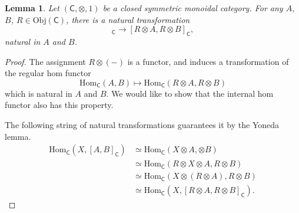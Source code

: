 \documentclass[a4paper,10pt]{scrreprt}
\newcommand{\Obj}{\mathrm{Obj}}
\newcommand{\Hom}{\mathrm{Hom}}
\theoremstyle{definition}
\theoremstyle{plain}
\newtheorem{lemma}{Lemma}[section]
\theoremstyle{remark}
\begin{document}
\begin{lemma}
  \label{lemma:cantensorbothsidesofinternalhom}
  Let $(\mathsf{C}, \otimes, 1)$ be a closed symmetric monoidal category. For any $A$, $B$, $R \in \Obj(\mathsf{C})$, there is a natural transformation
  \begin{equation*}
    [A, B]_{\mathsf{C}} \to [R \otimes A, R \otimes B]_{\mathsf{C}},
  \end{equation*}
  natural in $A$ and $B$.
\end{lemma}
\begin{proof}
  The assignment $R \otimes (-)$ is a functor, and induces a transformation of the regular hom functor
  \begin{equation*}
    \Hom_{\mathsf{C}}(A, B) \mapsto \Hom_{\mathsf{C}}(R \otimes A, R \otimes B)
  \end{equation*}
  which is natural in $A$ and $B$. We would like to show that the internal hom functor also has this property.

  The following string of natural transformations guarantees it by the Yoneda lemma.
  \begin{align*}
    \Hom_{\mathsf{C}}(X, [A, B]_{\mathsf{C}}) &\simeq \Hom_{\mathsf{C}}(X \otimes A, \otimes B) \\
    &\simeq \Hom_{\mathsf{C}}(R \otimes X \otimes A, R \otimes B) \\
    &\simeq \Hom_{\mathsf{C}}(X \otimes (R \otimes A), R \otimes B) \\
    & \simeq \Hom_{\mathsf{C}}(X, [R \otimes A, R \otimes B]_{\mathsf{C}}).
  \end{align*}
\end{proof}
\end{document}
